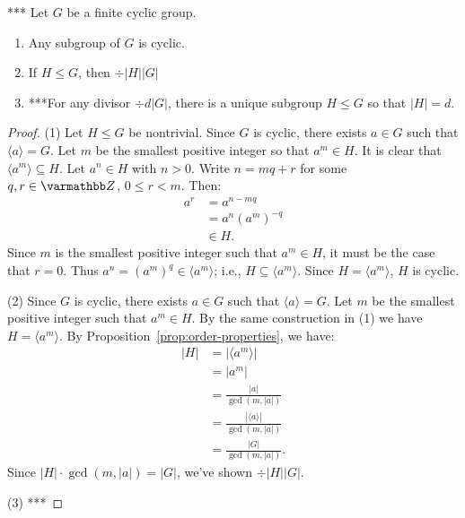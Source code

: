     \begin{theorem}***
        Let $G$ be a finite cyclic group.
            \begin{enumerate}[label = (\arabic*),itemsep=1pt,topsep=3pt]
                \item Any subgroup of $G$ is cyclic.
                \item If $H \leq G$, then $\div{|H|}{|G|}$
                \item ***For any divisor $\div{d}{|G|}$, there is a unique subgroup $H \leq G$ so that $|H| = d$.
            \end{enumerate}
    \end{theorem}
        \begin{proof}
            (1) Let $H \leq G$ be nontrivial. Since $G$ is cyclic, there exists $a \in G$ such that $\langle a \rangle = G$. Let $m$ be the smallest positive integer so that $a^m \in H$. It is clear that $\langle a^m \rangle \subseteq H$. Let $a^n \in H$ with $n > 0$. Write $n = mq + r$ for some $q,r \in \bfZ$, $0 \leq r  < m$. Then:
                \begin{equation*}
                \begin{split}
                    a^r 
                    & = a^{n-mq} \\
                    & = a^n (a^m)^{-q} \\
                    & \in H.
                \end{split}
                \end{equation*}
            Since $m$ is the smallest positive integer such that $a^m \in H$, it must be the case that $r = 0$. Thus $a^n = (a^m)^q \in \langle a^m \rangle$; i.e., $H \subseteq \langle a^m \rangle$. Since $H = \langle a^m \rangle$, $H$ is cyclic. \nl
            
            \noindent (2) Since $G$ is cyclic, there exists $a \in G$ such that $\langle a \rangle = G$. Let $m$ be the smallest positive integer such that $a^m \in H$. By the same construction in (1) we have $H = \langle a^m \rangle$. By Proposition~\ref{prop:order-properties}, we have:
                \begin{equation*}
                \begin{split}
                    |H|
                    & = |\langle a^m \rangle| \\
                    & = |a^m| \\
                    & = \frac{|a|}{\gcd(m,|a|)} \\
                    & = \frac{|\langle a \rangle|}{\gcd(m,|a|)} \\
                    & = \frac{|G|}{\gcd(m,|a|)}.
                \end{split}
                \end{equation*}
            Since $|H| \cdot \gcd(m,|a|) = |G|$, we've shown $\div{|H|}{|G|}$. \nl
            
            \noindent (3) ***
        \end{proof}

